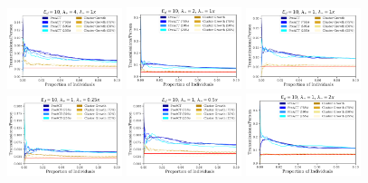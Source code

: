 \documentclass[a4paper,11pt]{article}
\begin{document}
\clearpage

\begin{figure}[!h]
\centering
\includegraphics[width=0.3\textwidth]{figs/results_efficacy_individual_SAMPLE-FIRSTART_ARTRATE-4.pdf}
\includegraphics[width=0.3\textwidth]{figs/results_efficacy_individual_SAMPLE-FIRSTART_ARTRATE-2.pdf}
\includegraphics[width=0.3\textwidth]{figs/results_efficacy_individual_SAMPLE-FIRSTART_ARTRATE-1.pdf}\\
\includegraphics[width=0.3\textwidth]{figs/results_efficacy_individual_SAMPLE-FIRSTART_STOPRATE-0.25x.pdf}
\includegraphics[width=0.3\textwidth]{figs/results_efficacy_individual_SAMPLE-FIRSTART_STOPRATE-0.5x.pdf}
\includegraphics[width=0.3\textwidth]{figs/results_efficacy_individual_SAMPLE-FIRSTART_STOPRATE-2x.pdf}\\

\end{figure}
\end{document}
